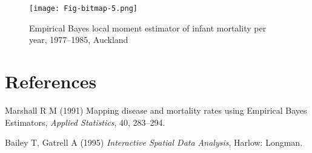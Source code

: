 \documentclass[a4paper,10pt]{article}
\begin{document}
\begin{figure}[htbp]
\begin{center} 
\begin{Schunk}
\texttt{[image: Fig-bitmap-5.png]}\end{Schunk}
\end{center}
\caption{Empirical Bayes local moment estimator of infant mortality per year, 1977--1985, Auckland}
\label{EBloc}
\end{figure}

\section*{References}

\begin{description}

\item Marshall R M (1991) Mapping disease and mortality rates using
Empirical Bayes Estimators, \emph{Applied Statistics}, 40, 283--294.

\item Bailey T, Gatrell A (1995) \emph{Interactive Spatial Data Analysis},
Harlow: Longman.

\end{description}
\end{document}
